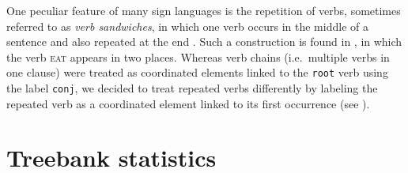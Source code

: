\documentclass[11pt]{article}
\begin{document}
One peculiar feature of many sign languages is the repetition of verbs, sometimes referred to as \textit{verb sandwiches}, in which one verb occurs in the middle of a sentence and also repeated at the end \cite{Bergman1994ideophones}. Such a construction is found in , in which the verb \textsc{eat} appears in two places. Whereas verb chains (i.e.~multiple verbs in one clause) were treated as coordinated elements linked to the \texttt{root} verb using the label \texttt{conj}, we decided to treat repeated verbs differently by labeling the repeated verb as a coordinated element linked to its first occurrence (see ).

\section{Treebank statistics}
\end{document}
